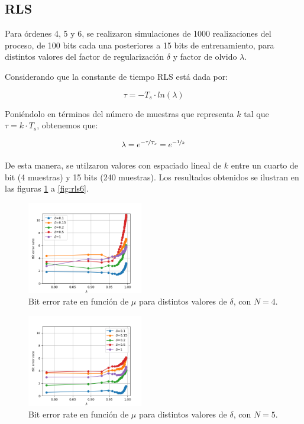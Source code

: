 \documentclass[main.tex]{subfiles}
\begin{document}
\subsection*{RLS}

Para \'ordenes 4, 5 y 6, se realizaron simulaciones de 1000
realizaciones del proceso, de 100 bits cada una posteriores a 15 bits de entrenamiento, para distintos valores del factor de regularizaci\'on $\delta$ y factor de olvido $\lambda$. 

Considerando que la constante de tiempo RLS est\'a dada por:

\begin{equation}
	\tau = -T_s \cdot ln(\lambda)
\end{equation}

Poni\'endolo en t\'erminos del n\'umero de muestras que representa $k$ tal que $\tau = k \cdot T_s$, obtenemos que:

\begin{equation}
	\lambda = e^{-\nicefrac{\tau}{T_s}} = e^{-\nicefrac{1}{k}}
\end{equation}

De esta manera, se utilzaron valores con espaciado lineal de  $k$ entre un cuarto de bit (4 muestras) y 15 bits (240 muestras). Los resultados obtenidos se ilustran en las figuras \ref{fig:rls4} a \ref{fig:rls6}.

\begin{figure}[htb]
	\centering
	\includegraphics[width=0.45\textwidth]
	{imagenes/rls_ber_n4.png}
	\caption{Bit error rate en funci\'on de $\mu$ para distintos valores de $\delta$, con $N=4$.}
	\label{fig:rls4}
\end{figure}

\begin{figure}[htb]
	\centering
	\includegraphics[width=0.45\textwidth]
	{imagenes/rls_ber_n5.png}
	\caption{Bit error rate en funci\'on de $\mu$ para distintos valores de $\delta$, con $N=5$.}
\end{figure}
\end{document}
